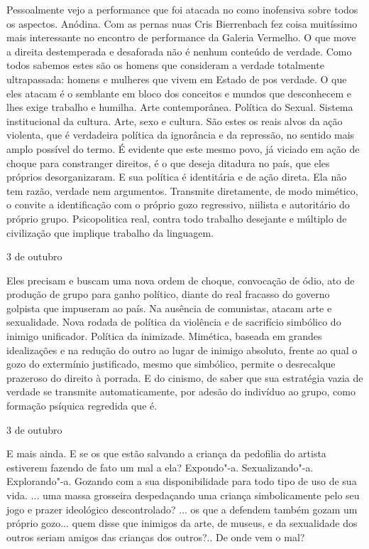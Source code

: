 Pessoalmente vejo a performance que foi atacada no  como inofensiva
sobre todos os aspectos. Anódina. Com as pernas nuas Cris Bierrenbach
fez coisa muitíssimo mais interessante no encontro de performance da
Galeria Vermelho. O que move a direita destemperada e desaforada não é
nenhum conteúdo de verdade. Como todos sabemos estes são os homens que
consideram a verdade totalmente ultrapassada: homens e mulheres que
vivem em Estado de pos verdade. O que eles atacam é o semblante em bloco
dos conceitos e mundos que desconhecem e lhes exige trabalho e humilha.
Arte contemporânea. Política do Sexual. Sistema institucional da
cultura. Arte, sexo e cultura. São estes os reais alvos da ação
violenta, que é verdadeira política da ignorância e da repressão, no
sentido mais amplo possível do termo. É evidente que este mesmo povo, já
viciado em ação de choque para constranger direitos, é o que deseja
ditadura no país, que eles próprios desorganizaram. E sua política é
identitária e de ação direta. Ela não tem razão, verdade nem argumentos.
Transmite diretamente, de modo mimético, o convite a identificação com o
próprio gozo regressivo, niilista e autoritário do próprio grupo.
Psicopolitica real, contra todo trabalho desejante e múltiplo de
civilização que implique trabalho da linguagem.

\begin{flushright}
3 de outubro
\end{flushright}

Eles precisam e buscam uma nova ordem de choque, convocação de ódio, ato
de produção de grupo para ganho político, diante do real fracasso do
governo golpista que impuseram ao país. Na ausência de comunistas,
atacam arte e sexualidade. Nova rodada de política da violência e de
sacrifício simbólico do inimigo unificador. Política da inimizade.
Mimética, baseada em grandes idealizações e na redução do outro ao lugar
de inimigo absoluto, frente ao qual o gozo do extermínio justificado,
mesmo que simbólico, permite o desrecalque prazeroso do direito à
porrada. E do cinismo, de saber que sua estratégia vazia de verdade se
transmite automaticamente, por adesão do indivíduo ao grupo, como
formação psíquica regredida que é.

\begin{flushright}
3 de outubro
\end{flushright}

E mais ainda. E se os que estão salvando a criança da pedofilia do
artista estiverem fazendo de fato um mal a ela? Expondo"-a.
Sexualizando"-a. Explorando"-a. Gozando com a sua disponibilidade para
todo tipo de uso de sua vida. ... uma massa grosseira despedaçando uma
criança simbolicamente pelo seu jogo e prazer ideológico descontrolado?
... os que a defendem também gozam um próprio gozo... quem disse que
inimigos da arte, de museus, e da sexualidade dos outros seriam amigos
das crianças dos outros?.. De onde vem o mal?

